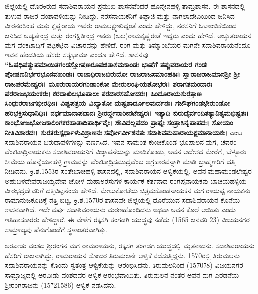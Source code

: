 ಜಿಲ್ಲೆಯಲ್ಲಿ ದೊರಕಿರುವ ಸದಾಶಿವರಾಯನ ಪ್ರಮುಖ ಶಾಸನವೆಂದರೆ ಹೊನ್ನೇನಹಳ್ಳಿ ತಾಮ್ರಶಾಸನ. ಈ ಶಾಸನದಲ್ಲಿ ತುಳುವ ರಾಜರ ವಂಶಾವಳಿಯನ್ನು ನೀಡಿದ್ದು, ನರಸನಾಯಕನಿಗೆ ತಿಪ್ಪಾಜಿ ಮತ್ತು ನಾಗಲಾದೇವಿಯಿಂದ ಜನಿಸಿದ ವೀರನರಸಿಂಹ ಮತ್ತು ಕೃಷ್ಣರಾಯ ಇವರು ರಾಮಲಕ್ಷ್ಮಣರಿದ್ದಂತೆ ಎಂದು ಹೇಳಿದ್ದು, ನರಸನಿಗೆ ಓಬಾಂಬಿಕೆಯಿಂದ ಜನಿಸಿದ ಅಚ್ಯತೇಂದ್ರ ಮತ್ತು ರಂಗಕ್ಷಿತೀಂದ್ರ ಇವರು (ಬಲ)ರಾಮಕೃಷ್ಣರಂತೆ ಇದ್ದರು ಎಂದು ಹೇಳಿದೆ. ಅಚ್ಯುತರಾಯನ ಮಗ ವೆಂಕಟಾದ್ರಿಗೆ ಪಟ್ಟಕಟ್ಟಿದ ವಿಚಾರವನ್ನು ಹೇಳಿದೆ. ರಂಗ ಮತ್ತು ತಿಮ್ಮಾಂಬೆಯರ ಮಗನೇ ಸದಾಶಿವರಾಯನೆಂದೂ ಇವನ ಹೆಂಡತಿಯ ಹೆಸರು ಸತ್ಯಭಾಮಾ ಎಂದೂ ಹೇಳಿದೆ. ಶಾಸನವು \textbf{“ಓಷಧಿಪತ್ಯುಪಮಾಯಿತಗಂಡಸ್ತೋಷಣರೂಪಜಿತಾಸಮಕಾಂಡಃ ಭಾಷೆಗೆ ತಪ್ಪುವರಾಯರ ಗಂಡಃ ಪೋಷಣನಿರ್ಭರಭೂನವಖಂಡಃ। ರಾಜಾಧಿರಾಜಬಿರುದೋ ರಾಜರಾಜಸಮಾಂಹತಿಃ। ಸ್ವಾರಾಜರಾಜಮಾನಶ‍್ರೀ ಶ‍್ರೀ ರಾಜಪರಮೇಶ್ವರಃ। ಮೂರುರಾಯರಗಂಡಾಂಕೋ ಮೇರುಲಂಘಿಯಶೋಭರಃ। ಶರಾಗತಮಂದಾರಃ ಪರರಾಜಭಯಂಕರಃ। ಕರದಾಖಿಲಭೂಪಾಲಃ ಪರದಾರಸಹೋದರಃ। ಹಿಂದೂರಾಯಸುರತ್ರಾಣ ಸಿಂಧುರರಾಜಗಭೀರಧೀಃ। ವಿಷ್ಟಪತ್ರಯ ವಿಖ್ಯಾತೋ ದುಷ್ಟಶಾರ್ದೂಲಮರ್ದನಃ। ಗಜೌಘಗಂಡಭೇರುಂಡೋ ಹರಿಭಕ್ತಿಸುಧಾನಿಧಿಃ। ವರ್ಧಮಾನಾಪದಾನಃ ಶ‍್ರೀರರ್ದ್ಧನಾರೀನಟೇಶ್ವರಃ। ಇತ್ಯಾದಿ ಬಿರುದೈರ್ವಂದಿತತ್ಯಾನಿತ್ಯಮಭಿಷ್ಟತಃ। ಕಾಂಭೋಜಭೋಜಕಾಲಿಂಗಕರಹಾತಾದಿಪಾರ್ಥಿವೈಃ। ಸೌವಿದಲ್ಲಪದಂ ಪ್ರಾಪ್ತೈಃ ಸಂತ್ರಾಸಿನೃಪಾಪದಃ। ಸೋಯಂ ನೀತಿವಿಶಾರದಃ। ಸುರತರುಸ್ಪರ್ಧಾಳುವಿಶ್ರಾಣನಃ ಸರ್ವೋರ್ವೀಶನತಃ ಸದಾಶಿವಮಹಾರಾಯಕ್ಷಮಾನಾಯಕಃ।} ಎಂಬ ಸದಾಶಿವರಾಯನ ಬಿರುದಾವಳಿಗಳನ್ನು ವರ್ಣಿಸಿದೆ. ಇವನ ಸಾಮಂತ ಕುಂಚಿಕೊಂಡ ಭೂಪಾಲನ ಮಗ, ಚವರಂ ವೆಂಕಟಾದ್ರಿನಾಯಕನು ಸದಾಶಿವರಾಯನಿಗೆ ವಿಜ್ಞಾಪನೆಯನ್ನು ಮಾಡಿಕೊಂಡು, ಅವನ ಆದೇಶದ ಮೇರೆಗೆ, ಬೆಳ್ಳೂರು ಸೀಮೆಯ ಹೊನ್ನೆಯನಹಳ್ಳಿ ಗ್ರಾಮವನ್ನು ವೆಂಕಟಾದ್ರಿಸಮುದ್ರವೆಂಬ ಅಗ್ರಹಾರವನ್ನಾಗಿ ಮಾಡಿ ಬ್ರಾಹ್ಮಣರಿಗೆ ದತ್ತಿ ನೀಡಿದನು. ಕ್ರಿ.ಶ.1553ರ ಸಂತೇಬಾಚಹಳ್ಳಿ ಶಾಸನದಲ್ಲಿ, ಸದಾಶಿವರಾಯನ ಆಳ್ವಿಕೆಯಲ್ಲಿ, ಅವನ ಮಹಾಮಂಡಲೇಶ್ವರ ಅಹುಬಳದೇವರಾಜಯ್ಯದೇವ ಚೋಳ ಮಹಾಅರಸುಗಳ ಕಾರ್ಯಕೆ ಕರ್ತನಾದ ರಂಗಪ್ಪನಾಯಕನು ಬಾಚಿಯಹಳ್ಳಿಯ ವೀರಭದ್ರದೇವರಿಗೆ ದತ್ತಿಬಿಟ್ಟನೆಂದು ಹೇಳಿದೆ. ಮೇಲುಕೋಟೆಯ ಚಿತ್ರಮಕೊಂಡನಾಯಕನ ಮಗ ರಾಯಪ್ಪ ನಾಯಕನು ರಾಮಾನುಜಕೂಟಕ್ಕೆ ದತ್ತಿ ಬಿಟ್ಟ, ಕ್ರಿ.ಶ.1570ರ ಶಾಸನವೇ ಜಿಲ್ಲೆಯಲ್ಲಿ ದೊರೆಯುವ ಸದಾಶಿವರಾಯನ ಕೊನೆಯ ಶಾಸನವಾಗಿದೆ. ಇದೇ ವರ್ಷ ಸದಾಶಿವರಾಯನು ಮರಣಹೊಂದಿದನು ಅಥವಾ ಅವನ ಕೊಲೆ ಆಯಿತು ಎಂದು ಇತಿಹಾಸಕಾರರು ಹೇಳಿದ್ದಾರೆ. ಈ ವೇಳೆಗೆ ರಕ್ಕಸಗಿ ತಂಗಡಗಿ ಯುದ್ಧವು ನಡೆದು (1565 ಜನವರಿ 23) ವಿಜಯನಗರ ಸಾಮ್ರಾಜ್ಯವು ಪೆನುಗೊಂಡೆಗೆ ಸ್ಥಳಾಂತರವಾಗಿತ್ತು. 

ಅರವೀಡು ವಂಶದ ಶ‍್ರೀರಂಗನ ಮಗ ರಾಮರಾಯನು, ರಕ್ಕಸಗಿ ತಂಗಡಗಿ ಯುದ್ಧದಲ್ಲಿ ಮೃತನಾದನು. ಸದಾಶಿವರಾಯನು ಹೆಸರಿಗೆ ರಾಜನಾಗಿದ್ದು, ರಾಮರಾಯನ ಸೋದರ ತಿರುಮಲನೇ ಆಳ್ವಿಕೆ ನಡೆಸುತ್ತಿದ್ದನು. 1570ರಲ್ಲಿ ತಿರುಮಲನು ಸದಾಶಿವರಾಯನನ್ನು ಕೊಂದು ಸ್ವತಂತ್ರ ಆಳ್ವಿಕೆಯನ್ನು ಆರಂಭಿಸಿದನು. ತಿರುಮಲನಿಂದ (157078) ವಿಜಯನಗರ ಸಾಮ್ರಾಜ್ಯದಲ್ಲಿ ಅರವೀಡು ವಂಶದವರ ಆಳ್ವಿಕೆ ಆರಂಭವಾಯಿತು. ತಿರುಮಲನ ನಂತರ ಅವನ ಮಗ ಎರಡನೆಯ ಶ‍್ರೀರಂಗರಾಜನು (15721586) ಆಳ್ವಿಕೆ ನಡೆಸಿದನು.

